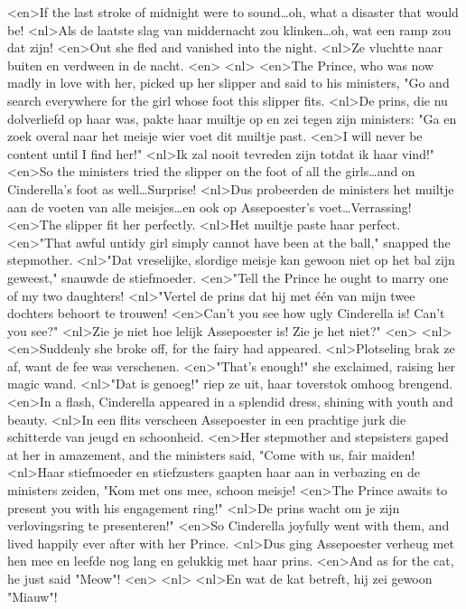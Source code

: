 <en>If the last stroke of midnight were to sound\ldots oh, what a disaster that would be!
<nl>Als de laatste slag van middernacht zou klinken\ldots oh, wat een ramp zou dat zijn!
<en>Out she fled and vanished into the night.
<nl>Ze vluchtte naar buiten en verdween in de nacht.
<en>
<nl>
<en>The Prince, who was now madly in love with her, picked up her slipper and said to his ministers, "Go and search everywhere for the girl whose foot this slipper fits.
<nl>De prins, die nu dolverliefd op haar was, pakte haar muiltje op en zei tegen zijn ministers: "Ga en zoek overal naar het meisje wier voet dit muiltje past.
<en>I will never be content until I find her!" 
<nl>Ik zal nooit tevreden zijn totdat ik haar vind!"
<en>So the ministers tried the slipper on the foot of all the girls\ldots and on Cinderella’s foot as well\ldots Surprise!
<nl>Dus probeerden de ministers het muiltje  aan de voeten van alle meisjes\ldots en ook op Assepoester's voet\ldots Verrassing!
<en>The slipper fit her perfectly.
<nl>Het muiltje paste haar perfect.
<en>"That awful untidy girl simply cannot have been at the ball," snapped the stepmother.
<nl>"Dat vreselijke, slordige meisje kan gewoon niet op het bal zijn geweest," snauwde de stiefmoeder.
<en>"Tell the Prince he ought to marry one of my two daughters!
<nl>"Vertel de prins dat hij met \'e\'en van mijn twee dochters behoort te trouwen!
<en>Can’t you see how ugly Cinderella is! Can’t you see?"
<nl>Zie je niet hoe lelijk Assepoester is! Zie je het niet?"
<en>
<nl>
<en>Suddenly she broke off, for the fairy had appeared.
<nl>Plotseling brak ze af, want de fee was verschenen.
<en>"That’s enough!" she exclaimed, raising her magic wand.
<nl>"Dat is genoeg!" riep ze uit, haar toverstok omhoog brengend.
<en>In a flash, Cinderella appeared in a splendid dress, shining with youth and beauty.
<nl>In een flits verscheen Assepoester in een prachtige jurk die schitterde van jeugd en schoonheid.
<en>Her stepmother and stepsisters gaped at her in amazement, and the ministers said, "Come with us, fair maiden!
<nl>Haar stiefmoeder en stiefzusters gaapten  haar aan in verbazing en de ministers zeiden, "Kom met ons mee, schoon meisje!
<en>The Prince awaits to present you with his engagement ring!" 
<nl>De prins wacht om je zijn verlovingsring te presenteren!"
<en>So Cinderella joyfully went with them, and lived happily ever after with her Prince.
<nl>Dus ging Assepoester verheug met hen mee en leefde nog lang en gelukkig met haar prins.
<en>And as for the cat, he just said "Meow"!
<en>
<nl>
<nl>En wat de kat betreft, hij zei gewoon "Miauw"!
